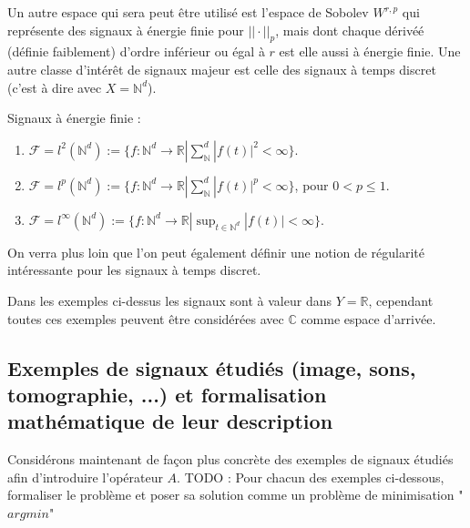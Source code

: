 Un autre espace qui sera peut être utilisé est l'espace de Sobolev $W^{r, p}$ qui représente des signaux à énergie finie pour $||\cdot|| _p$, mais dont chaque dérivéé (définie faiblement) d'ordre inférieur ou égal à $r$ est elle aussi à énergie finie.
\newline
Une autre classe d'intérêt de signaux majeur est celle des signaux à temps discret (c'est à dire avec $X = \mathbb{N}^d$).
\begin{exemple}
	Signaux à énergie finie :
	\begin{enumerate}
		\item $\mathcal{F} = l^2(\mathbb{N}^d) := \{f : \mathbb{N}^d \longrightarrow \mathbb{R} | \sum_\mathbb{N}^d |f(t)|^2 < \infty\}$.
		\item $\mathcal{F} = l^p(\mathbb{N}^d) := \{f : \mathbb{N}^d \longrightarrow \mathbb{R} | \sum_\mathbb{N}^d |f(t)|^p < \infty\}$, pour $0 < p \leq 1$.
		\item $\mathcal{F} = l^\infty(\mathbb{N}^d) := \{f : \mathbb{N}^d \longrightarrow \mathbb{R} | \sup_{t\in \mathbb{N}^d} |f(t)| < \infty\}$.
	\end{enumerate}
\end{exemple}
On verra plus loin que l'on peut également définir une notion de régularité intéressante pour les signaux à temps discret.
\begin{remarque}
	Dans les exemples ci-dessus les signaux sont à valeur dans $Y = \mathbb{R}$, cependant toutes ces exemples peuvent être considérées avec $\mathbb{C}$ comme espace d'arrivée. 
\end{remarque}

\subsection{Exemples de signaux étudiés (image, sons, tomographie, ...) et formalisation mathématique de leur description}
Considérons maintenant de façon plus concrète des exemples de signaux étudiés afin d'introduire l'opérateur $A$.
\newline
TODO : Pour chacun des exemples ci-dessous, formaliser le problème et poser sa solution comme un problème de minimisation "$argmin$"

